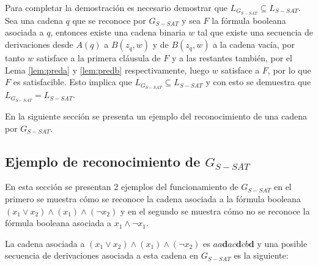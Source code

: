 \documentclass[12pt]{article}
\begin{document}
Para completar la demostración es necesario demostrar que $ L_{G_{S-SAT}}\subseteq L_{S-SAT}$. Sea una cadena $q$ que se reconoce por $G_{S-SAT}$ y sea $F$ la fórmula booleana asociada a $q$, entonces existe una cadena binaria $w$ tal que existe una secuencia de derivaciones desde $A(q)$ a $B(z_q,w)$ y de $B(z_q,w)$ a la cadena vacía, por tanto $w$ satisface a la primera cláusula de $F$ y a las restantes también, por el Lema \ref{lem:preda} y \ref{lem:predb} respectivamente, luego $w$ satisface a $F$, por lo que $F$ es satisfacible. Esto implica que $L_{G_{S-SAT}}\subseteq L_{S-SAT}$ y con esto se demuestra que $L_{G_{S-SAT}}= L_{S-SAT}$.

En la siguiente sección se presenta un ejemplo del reconocimiento de una cadena por $G_{S-SAT}$.

\subsection{Ejemplo de reconocimiento de $G_{S-SAT}$}

En esta sección se presentan 2 ejemplos del funcionamiento de $G_{S-SAT}$ en el primero se muestra cómo se reconoce la cadena asociada a la fórmula booleana $(x_1 \vee x_2) \wedge (x_1) \wedge (\neg x_2)$ y en el segundo se muestra cómo no se reconoce la fórmula booleana asociada a $x_1 \wedge \neg x_1$.

La cadena asociada a $(x_1 \vee x_2) \wedge (x_1) \wedge (\neg x_2)$ es $aa\mathbf{d}ac\mathbf{d}cb\mathbf{d}$ y una posible secuencia de derivaciones
asociada a esta cadena en $G_{S-SAT}$ es la siguiente:
\end{document}
